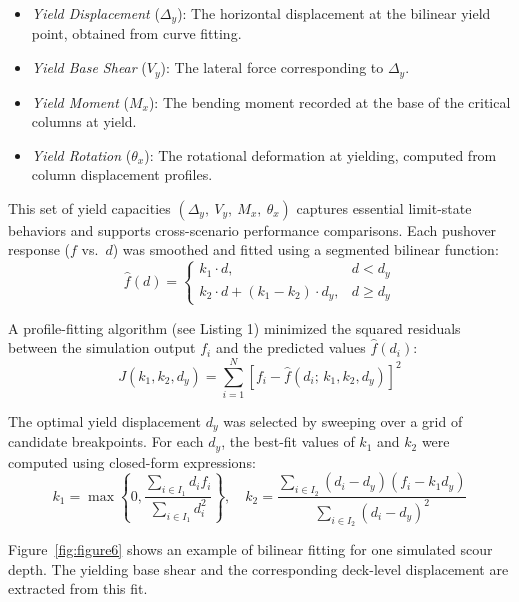 \documentclass[authoryear,preprint,review,12pt]{elsarticle}
\begin{document}
\begin{itemize}
    \item \textit{Yield Displacement} ($\Delta_y$): The horizontal displacement at the bilinear yield point, obtained from curve fitting.
    \item \textit{Yield Base Shear} ($V_y$): The lateral force corresponding to $\Delta_y$.
    \item \textit{Yield Moment} ($M_x$): The bending moment recorded at the base of the critical columns at yield.
    \item \textit{Yield Rotation} ($\theta_x$): The rotational deformation at yielding, computed from column displacement profiles.
\end{itemize}

This set of yield capacities $(\Delta_y,\ V_y,\ M_x,\ \theta_x)$ captures essential limit-state behaviors and supports cross-scenario performance comparisons. Each pushover response ($f$ vs.\ $d$) was smoothed and fitted using a segmented bilinear function:
\begin{equation}
\hat{f}(d) = 
\begin{cases}
    k_1 \cdot d, & d < d_y \\
    k_2 \cdot d + (k_1 - k_2) \cdot d_y, & d \geq d_y
\end{cases}
\label{eq:bilinear_fit}
\end{equation}

A profile-fitting algorithm (see Listing 1) minimized the squared residuals between the simulation output $f_i$ and the predicted values $\hat{f}(d_i)$:
\begin{equation}
J(k_1, k_2, d_y) = \sum_{i=1}^{N} \left[ f_i - \hat{f}(d_i;\,k_1, k_2, d_y) \right]^2
\label{eq:residual}
\end{equation}

The optimal yield displacement $d_y$ was selected by sweeping over a grid of candidate breakpoints. For each $d_y$, the best-fit values of $k_1$ and $k_2$ were computed using closed-form expressions:
\begin{equation}
k_1 = \max \left\{ 0, \frac{\sum_{i \in I_1} d_i f_i}{\sum_{i \in I_1} d_i^2} \right\}, \quad
k_2 = \frac{\sum_{i \in I_2} (d_i - d_y)(f_i - k_1 d_y)}{\sum_{i \in I_2} (d_i - d_y)^2}
\label{eq:k1_k2}
\end{equation}

Figure~\ref{fig:figure6} shows an example of bilinear fitting for one simulated scour depth. The yielding base shear and the corresponding deck-level displacement are extracted from this fit.
\end{document}
